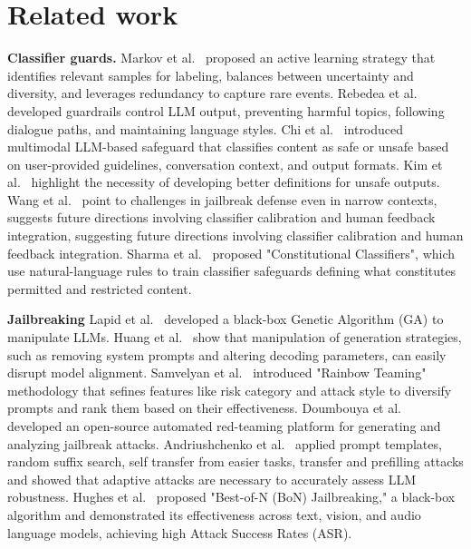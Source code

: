 \section{Related work}
\textbf{Classifier guards.} Markov et al.~\cite{markov2023holisticapproachundesiredcontent} proposed an active learning strategy that identifies relevant samples for labeling, balances between uncertainty and diversity, and leverages redundancy to capture rare events. Rebedea et al.~\cite{rebedea2023nemoguardrailstoolkitcontrollable} developed guardrails control LLM output, preventing harmful topics, following dialogue paths, and maintaining language styles. Chi et al.~\cite{chi2024llamaguard3vision} introduced multimodal LLM-based safeguard that classifies content as safe or unsafe based on user-provided guidelines, conversation context, and output formats. Kim et al.~\cite{kim2024testinglimitsjailbreakingdefenses} highlight the necessity of developing better definitions for unsafe outputs. Wang et al.~\cite{wang2024jailbreakdefensenarrowdomain} point to challenges in jailbreak defense even in narrow contexts, suggests future directions involving classifier calibration and human feedback integration, suggesting future directions involving classifier calibration and human feedback integration. Sharma et al.~\cite{sharma2025constitutionalclassifiersdefendinguniversal} proposed "Constitutional Classifiers", which use natural-language rules to train classifier safeguards defining what constitutes permitted and restricted content.

\textbf{Jailbreaking} Lapid et al.~\cite{lapid2024opensesameuniversalblack} developed a black-box Genetic Algorithm (GA) to manipulate LLMs. Huang et al.~\cite{huang2023catastrophicjailbreakopensourcellms} show that manipulation of generation strategies, such as removing system prompts and altering decoding parameters, can easily disrupt model alignment. Samvelyan et al.~\cite{samvelyan2024rainbowteamingopenendedgeneration} introduced "Rainbow Teaming" methodology that sefines features like risk category and attack style to diversify prompts and rank them based on their effectiveness. Doumbouya et al.~\cite{doumbouya2024h4rm3ldynamicbenchmarkcomposable} developed an open-source automated red-teaming platform for generating and analyzing jailbreak attacks. Andriushchenko et al.~\cite{andriushchenko2024jailbreakingleadingsafetyalignedllms} applied prompt templates, random suffix search, self transfer from easier tasks, transfer and prefilling attacks and showed that adaptive attacks are necessary to accurately assess LLM robustness. Hughes et al.~\cite{hughes2024bestofnjailbreaking} proposed "Best-of-N (BoN) Jailbreaking," a black-box algorithm and demonstrated its effectiveness across text, vision, and audio language models, achieving high Attack Success Rates (ASR).